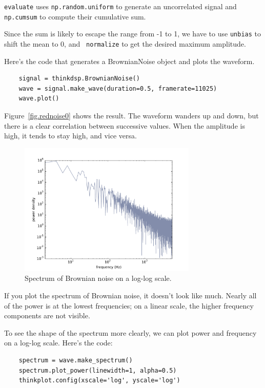 \documentclass[12pt]{book}
\begin{document}
{\tt evaluate} uses {\tt np.random.uniform} to generate an
uncorrelated signal and {\tt np.cumsum} to compute their cumulative
sum.

Since the sum is likely to escape the range from -1 to
1, we have to use {\tt unbias} to shift the mean to 0, and {\tt
  normalize} to get the desired maximum amplitude.

Here's the code that generates a BrownianNoise object and plots the
waveform.

\begin{verbatim}
    signal = thinkdsp.BrownianNoise()
    wave = signal.make_wave(duration=0.5, framerate=11025)
    wave.plot()
\end{verbatim}

Figure~\ref{fig.rednoise0} shows the result.  The waveform
wanders up and down, but there is a clear correlation between
successive values.  When the amplitude is high, it tends to stay
high, and vice versa.

\begin{figure}
\centerline{\includegraphics[height=2.5in]{figs/rednoise3.pdf}}
\caption{Spectrum of Brownian noise on a log-log scale.}
\label{fig.rednoise3}
\end{figure}

If you plot the spectrum of Brownian noise, it doesn't look like
much.  Nearly all of the power is at the lowest frequencies; on a
linear scale, the higher frequency components are not visible.

To see the shape of the spectrum more clearly, we can plot power
and frequency on a log-log scale.  Here's the code:

\begin{verbatim}
    spectrum = wave.make_spectrum()
    spectrum.plot_power(linewidth=1, alpha=0.5)
    thinkplot.config(xscale='log', yscale='log')
\end{verbatim}
\end{document}
